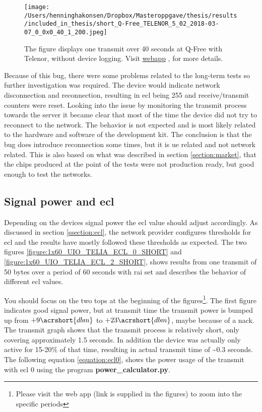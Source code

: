 \documentclass[USenglish]{ifimaster}  %
\begin{document}
\begin{figure}[H]
  \centering
  \texttt{[image: /Users/henninghakonsen/Dropbox/Masteroppgave/thesis/results/included\_in\_thesis/short\_Q-Free\_TELENOR\_5\_02\_2018-03-07\_0\_0x0\_40\_1\_200.jpeg]}
  \caption[Short-term test - loss of connection, without device logging]{The figure displays one transmit over 40 seconds at Q-Free with Telenor, without device logging. Visit \href{http://158.39.77.97:9000/\#/results/Q-Free_TELENOR\_5.02\_2018-03-07\_0\_0x0\_40\_1\_200}{webapp} \cite{online:result3}, for more details.}
  \label{figure:1x40_QFREE_TELENOR_0LOG_SHORT}
\end{figure}

Because of this bug, there were some problems related to the long-term tests so further investigation was required. The device would indicate network disconnection and reconnection, resulting in \acrshort{ecl} being 255 and receive/transmit counters were reset. Looking into the issue by monitoring the transmit process towards the server it became clear that most of the time the device did not try to reconnect to the network. The behavior is not expected and is most likely related to the hardware and software of the development kit. The conclusion is that the bug does introduce reconnection some times, but it is \acrshort{ue} related and not network related. This is also based on what was described in section \vref{section:market}, that the chips produced at the point of the tests were not production ready, but good enough to test the networks.

\subsection{Signal power and \acrshort{ecl}} \label{ssection:ecltest}
Depending on the devices signal power the \acrshort{ecl} value should adjust accordingly. As discussed in section \vref{ssection:ecl}, the network provider configures thresholds for \acrshort{ecl} and the results have mostly followed these thresholds as expected. The two figures \vref{figure:1x60_UIO_TELIA_ECL_0_SHORT} and \vref{figure:1x60_UIO_TELIA_ECL_2_SHORT}, shows results from one transmit of 50 bytes over a period of 60 seconds with \acrshort{rai} set and describes the behavior of different \acrshort{ecl} values.

You should focus on the two tops at the beginning of the figures\footnote{Please visit the web app (link is supplied in the figures) to zoom into the specific periods}. The first figure indicates good signal power, but at transmit time the transmit power is bumped up from ${+9 \acrshort{dbm}}$ to ${+23 \acrshort{dbm}}$, maybe because of a \acrshort{nack}. The transmit graph shows that the transmit process is relatively short, only covering approximately 1.5 seconds.
In addition the device was actually only active for 15-20\% of that time, resulting in actual transmit time of \textasciitilde0.3 seconds. The following equation \vref{equation:ecl0}, shows the power usage of the transmit with \acrshort{ecl} 0 using the program \textbf{power\_calculator.py}.
\end{document}

